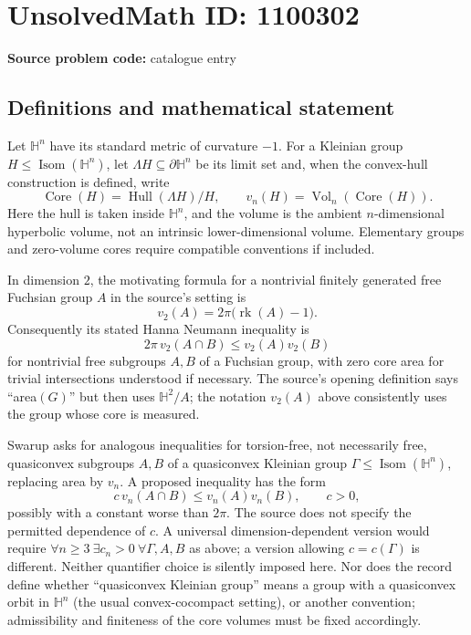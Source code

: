 \documentclass[11pt]{article}
\begin{document}
\section*{UnsolvedMath ID: 1100302}
\textbf{Source problem code:} catalogue entry
\subsection{Definitions and mathematical statement}
Let $\mathbb H^n$ have its standard metric of curvature $-1$. For a Kleinian group $H\leq\operatorname{Isom}(\mathbb H^n)$, let $\Lambda H\subseteq\partial\mathbb H^n$ be its limit set and, when the convex-hull construction is defined, write
\[
\operatorname{Core}(H)=\operatorname{Hull}(\Lambda H)/H,
\qquad v_n(H)=\operatorname{Vol}_n(\operatorname{Core}(H)).
\]
Here the hull is taken inside $\mathbb H^n$, and the volume is the ambient $n$-dimensional hyperbolic volume, not an intrinsic lower-dimensional volume. Elementary groups and zero-volume cores require compatible conventions if included.

In dimension $2$, the motivating formula for a nontrivial finitely generated free Fuchsian group $A$ in the source's setting is
\[
v_2(A)=2\pi\bigl(\operatorname{rk}(A)-1\bigr).
\]
Consequently its stated Hanna Neumann inequality is
\[
2\pi\,v_2(A\cap B)\leq v_2(A)v_2(B)
\]
for nontrivial free subgroups $A,B$ of a Fuchsian group, with zero core area for trivial intersections understood if necessary. The source's opening definition says ``area$(G)$'' but then uses $\mathbb H^2/A$; the notation $v_2(A)$ above consistently uses the group whose core is measured.

Swarup asks for analogous inequalities for torsion-free, not necessarily free, quasiconvex subgroups $A,B$ of a quasiconvex Kleinian group $\Gamma\leq\operatorname{Isom}(\mathbb H^n)$, replacing area by $v_n$. A proposed inequality has the form
\[
c\,v_n(A\cap B)\leq v_n(A)v_n(B),\qquad c>0,
\]
possibly with a constant worse than $2\pi$. The source does not specify the permitted dependence of $c$. A universal dimension-dependent version would require $\forall n\geq3\ \exists c_n>0\ \forall\Gamma,A,B$ as above; a version allowing $c=c(\Gamma)$ is different. Neither quantifier choice is silently imposed here. Nor does the record define whether ``quasiconvex Kleinian group'' means a group with a quasiconvex orbit in $\mathbb H^n$ (the usual convex-cocompact setting), or another convention; admissibility and finiteness of the core volumes must be fixed accordingly.
\end{document}
